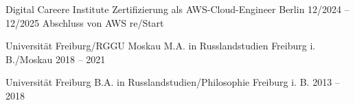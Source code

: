 
\begin{cventries}

  \cventry
  {Digital Careere Institute} %
  {Zertifizierung als AWS-Cloud-Engineer} %
  {Berlin} %
  {12/2024 – 12/2025} %
  {Abschluss von AWS re/Start}
  \vspace{2.0mm}

  \cventry
  {Universität Freiburg/RGGU Moskau} %
  {M.A. in Russlandstudien} %
  {Freiburg i. B./Moskau} %
  {2018 – 2021} %
  {}
  \vspace{2.0mm}

  \cventry
  {Universität Freiburg} %
  {B.A. in Russlandstudien/Philosophie} %
  {Freiburg i. B.} %
  {2013 – 2018} %
  {}

\end{cventries}
